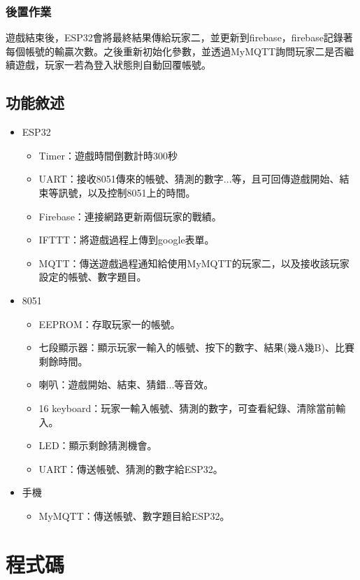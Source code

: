 \documentclass{scrartcl}
\begin{document}
\subsubsection{後置作業}
{\indent}遊戲結束後，ESP32會將最終結果傳給玩家二，並更新到firebase，firebase記錄著每個帳號的輸贏次數。之後重新初始化參數，並透過MyMQTT詢問玩家二是否繼續遊戲，玩家一若為登入狀態則自動回覆帳號。

\subsection{功能敘述}
\begin{itemize}

\item ESP32
\begin{itemize}
\item Timer：遊戲時間倒數計時300秒
\item UART：接收8051傳來的帳號、猜測的數字...等，且可回傳遊戲開始、結束等訊號，以及控制8051上的時間。
\item Firebase：連接網路更新兩個玩家的戰績。
\item IFTTT：將遊戲過程上傳到google表單。
\item MQTT：傳送遊戲過程通知給使用MyMQTT的玩家二，以及接收該玩家設定的帳號、數字題目。
\end{itemize}

\item 8051
\begin{itemize}
\item EEPROM：存取玩家一的帳號。
\item 七段顯示器：顯示玩家一輸入的帳號、按下的數字、結果(幾A幾B)、比賽剩餘時間。
\item 喇叭：遊戲開始、結束、猜錯...等音效。
\item 16 keyboard：玩家一輸入帳號、猜測的數字，可查看紀錄、清除當前輸入。
\item LED：顯示剩餘猜測機會。
\item UART：傳送帳號、猜測的數字給ESP32。
\end{itemize}

\item 手機
\begin{itemize}
\item MyMQTT：傳送帳號、數字題目給ESP32。
\end{itemize}

\end{itemize}


\section{程式碼}
\end{document}

